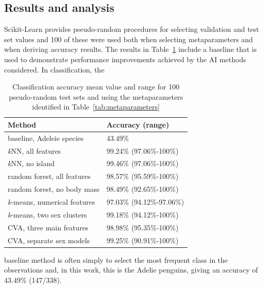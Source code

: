 \documentclass[a4paper, 11pt]{article}
\begin{document}
\subsection*{Results and analysis}
Scikit-Learn provides pseudo-random procedures for selecting validation and test set values and 100 of these were used 
both when selecting metaparameters and when deriving accuracy results.
The results in Table~\ref{tab:results} include a baseline that is used to demonstrate 
performance improvements achieved by the AI methods considered. In classification, the
\begin{table} %
  \small
  \begin{center}
  \vspace{-3\baselineskip} %
  \setlength{\abovecaptionskip}{5pt}
  \setlength{\belowcaptionskip}{5pt}
  \fontsize{10}{10}\selectfont %
  \begin{tabular}{l|l}
  \textbf{Method} & \textbf{Accuracy (range)}\\
  \hline
  baseline, Adeleie species & 43.49\% \\
  \hline
  \textit{k}NN, all features & 99.24\% (97.06\%-100\%)\\
  \textit{k}NN, no island &	99.46\% (97.06\%-100\%)\\
  \hline
  random forest, all features	& 98.57\% (95.59\%-100\%)\\
  random forest, no body mass & 98.49\% (92.65\%-100\%)\\
  \hline
  \textit{k}-means, numerical features & 97.03\% (94.12\%-97.06\%)\\
  \textit{k}-means, two sex clusters  & 99.18\% (94.12\%-100\%)\\
  \hline
  CVA, three main features & 98.98\% (95.35\%-100\%)\\
  CVA, separate sex models & 99.25\% (90.91\%-100\%)\\
  \hline
  \end{tabular}
  \vspace{-2\baselineskip} %
  \end{center} 
  \caption{\centering\linespread{0.8}\selectfont Classification accuracy mean value and range for 100 pseudo-random test sets 
  and using the metaparameters identified in Table~\ref{tab:metaparameters}}
  \vspace{-0.5\baselineskip} %
  \label{tab:results}
\end{table} 
baseline method is often simply to select the most frequent class in the observations and, 
in this work, this is the Adelie penguins, giving an accuracy of 43.49\% (147/338).
\end{document}
